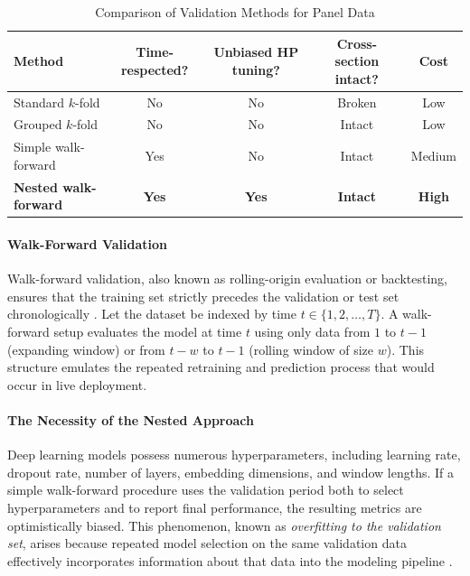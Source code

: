 \begin{table}[H]
	\footnotesize
	\centering
	\caption{\small Comparison of Validation Methods for Panel Data}
	\label{tab:comparison}
	\begin{tabular}{@{}lcccc@{}}
		\toprule
		\textbf{Method}              & \textbf{Time-respected?} & \textbf{Unbiased HP tuning?} & \textbf{Cross-section intact?} & \textbf{Cost} \\
		\midrule
		Standard $k$-fold            & No                       & No                           & Broken                         & Low           \\
		Grouped $k$-fold             & No                       & No                           & Intact                         & Low           \\
		Simple walk-forward          & Yes                      & No                           & Intact                         & Medium        \\
		\textbf{Nested walk-forward} & \textbf{Yes}             & \textbf{Yes}                 & \textbf{Intact}                & \textbf{High} \\
		\bottomrule
	\end{tabular}
\end{table}

\paragraph{Walk-Forward Validation}
Walk-forward validation, also known as rolling-origin evaluation or backtesting, ensures that the training set strictly precedes the validation or test set chronologically \citep{pardo2008evaluation}. Let the dataset be indexed by time $t \in \{1,2,\dots,T\}$. A walk-forward setup evaluates the model at time $t$ using only data from $1$ to $t-1$ (expanding window) or from $t-w$ to $t-1$ (rolling window of size $w$). This structure emulates the repeated retraining and prediction process that would occur in live deployment.

\paragraph{The Necessity of the Nested Approach}
Deep learning models possess numerous hyperparameters, including learning rate, dropout rate, number of layers, embedding dimensions, and window lengths. If a simple walk-forward procedure uses the validation period both to select hyperparameters and to report final performance, the resulting metrics are optimistically biased. This phenomenon, known as \textit{overfitting to the validation set}, arises because repeated model selection on the same validation data effectively incorporates information about that data into the modeling pipeline \citep{cawley2010overfitting}.

